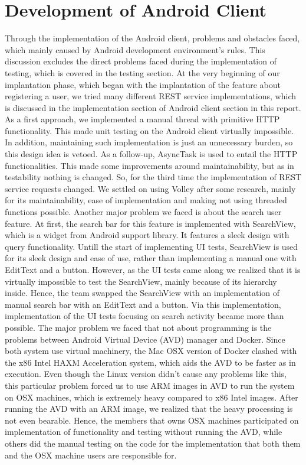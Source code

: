 \documentclass[11pt,a4paper]{report}
\begin{document}
\section{Development of Android Client} \label{android-problems-faced}
Through the implementation of the Android client, problems and obstacles faced, which mainly caused by Android development environment’s rules. This discussion excludes the direct problems faced during the implementation of testing, which is covered in the testing section.
At the very beginning of our implantation phase, which began with the implantation of the feature about registering a user, we tried many different REST service implementations, which is discussed in the implementation section of Android client section in this report. As a first approach, we implemented a manual thread with primitive HTTP functionality. This made unit testing on the Android client virtually impossible. In addition, maintaining such implementation is just an unnecessary burden, so this design idea is vetoed. As a follow-up, AsyncTask is used to entail the HTTP functionalities. This made some improvements around maintainability, but as in testability nothing is changed. So, for the third time the implementation of REST service requests changed. We settled on using Volley after some research, mainly for its maintainability, ease of implementation and making not using threaded functions possible.
Another major problem we faced is about the search user feature. At first, the search bar for this feature is implemented with SearchView, which is a widget from Android support library. It features a sleek design with query functionality. Untill the start of implementing UI tests, SearchView is used for its sleek design and ease of use, rather than implementing a manual one with EditText and a button. However, as the UI tests came along we realized that it is virtually impossible to test the SearchView, mainly because of its hierarchy inside. Hence, the team swapped the SearchView with an implementation of manual search bar with an EditText and a button. Via this implementation, implementation of the UI tests focusing on search activity became more than possible.
The major problem we faced that not about programming is the problems between Android Virtual Device (AVD) manager and Docker. Since both system use virtual machinery, the Mac OSX version of Docker clashed with the x86 Intel HAXM Acceleration system, which aids the AVD to be faster as in execution. Even though the Linux version didn’t cause any problems like this, this particular problem forced us to use ARM images in AVD to run the system on OSX machines, which is extremely heavy compared to x86 Intel images. After running the AVD with an ARM image, we realized that the heavy processing is not even bearable. Hence, the members that owns OSX machines participated on implementation of functionality and testing without running the AVD, while others did the manual testing on the code for the implementation that both them and the OSX machine users are responsible for.
\end{document}
